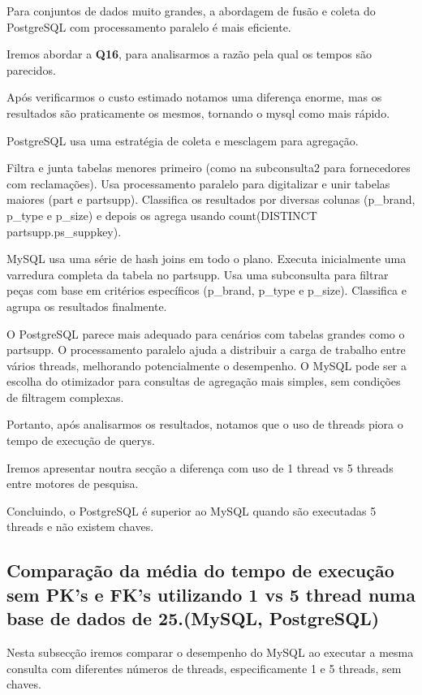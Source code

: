 \documentclass{article}
\begin{document}
Para conjuntos de dados muito grandes, a abordagem de fusão e coleta do PostgreSQL com processamento paralelo é mais eficiente.


Iremos abordar a \textbf{Q16}, para analisarmos a razão pela qual os tempos são parecidos.

Após verificarmos o custo estimado notamos uma diferença enorme, mas os resultados são praticamente os mesmos, tornando o mysql como mais rápido.

PostgreSQL usa uma estratégia de coleta e mesclagem para agregação.

Filtra e junta tabelas menores primeiro (como na subconsulta2 para fornecedores com reclamações).
Usa processamento paralelo para digitalizar e unir tabelas maiores (part e partsupp).
Classifica os resultados por diversas colunas (p\_brand, p\_type e p\_size) e depois os agrega usando count(DISTINCT partsupp.ps\_suppkey).


MySQL usa uma série de hash joins em todo o plano.
Executa inicialmente uma varredura completa da tabela no partsupp.
Usa uma subconsulta para filtrar peças com base em critérios específicos (p\_brand, p\_type e p\_size).
Classifica e agrupa os resultados finalmente.

O PostgreSQL parece mais adequado para cenários com tabelas grandes como o partsupp. O processamento paralelo ajuda a distribuir a carga de trabalho entre vários threads, melhorando potencialmente o desempenho.
O MySQL pode ser a escolha do otimizador para consultas de agregação mais simples, sem condições de filtragem complexas.

Portanto, após analisarmos os resultados, notamos que o uso de threads piora o tempo de execução de querys.

Iremos apresentar noutra secção a diferença com uso de 1 thread vs 5 threads entre motores de pesquisa.

Concluindo, o PostgreSQL é superior ao MySQL quando são executadas 5 threads e não existem chaves.

\clearpage
  \subsection{Comparação da média do tempo de execução sem PK's e FK's
  utilizando 1 vs 5 thread numa base de dados de 25.(MySQL, PostgreSQL)}
  
  \texttt{}\par Nesta subsecção iremos comparar o desempenho do MySQL ao executar a mesma consulta com diferentes números de threads, especificamente 1 e 5 threads, sem chaves. 
  
\end{document}
